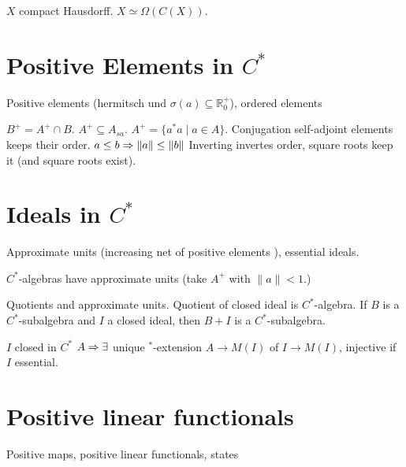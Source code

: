 \documentclass[a4paper, twocolumn, 10pt]{article}
\begin{document}
\begin{theorem}
    $X$ compact Hausdorff. $X \simeq \Omega(C(X))$.
\end{theorem}

\section{Positive Elements in $C^*$}

\begin{definition}
    Positive elements (hermitsch und $\sigma(a) \subseteq \mathds{R}^+_0$), ordered elements
\end{definition}

\begin{theorem}
    $B^+ = A^+ \cap B$.
    $A^+ \subseteq A_{sa}$.
    $A^+ = \{a^* a \mid a \in A\}$.
    Conjugation self-adjoint elements keeps their order. 
    $a \leq b \Rightarrow \|a\| \leq \|b\|$
    Inverting invertes order, square roots keep it (and square roots exist).
\end{theorem}

\section{Ideals in $C^*$}

\begin{definition}
    Approximate units (increasing net of positive elements ), essential ideals.
\end{definition}

\begin{theorem}
    $C^*$-algebras have approximate units (take $A^+$ with $\|a\| < 1$.)
\end{theorem}

\begin{theorem}
    Quotients and approximate units.
    Quotient of closed ideal is $C^*$-algebra.
    If $B$ is a $C^*$-subalgebra and $I$ a closed ideal, then $B+I$ is a $C^*$-subalgebra.
\end{theorem}

\begin{theorem}
    $I$ closed in $C^*$ $A \Rightarrow \exists$ unique $^*$-extension $A \to M(I)$ of $I \to M(I)$, injective if $I$ essential.
\end{theorem}

\section{Positive linear functionals}
\begin{definition}
    Positive maps, positive linear functionals, states
\end{definition}
\end{document}
